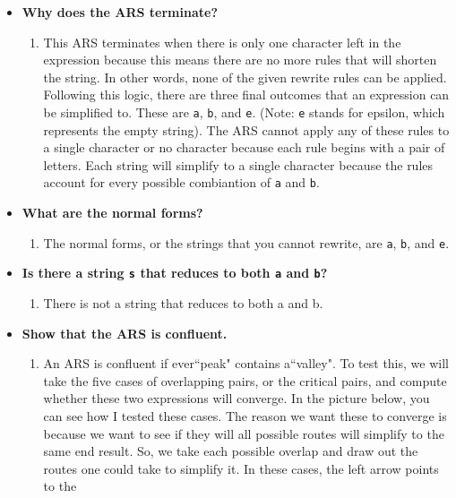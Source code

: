 \documentclass{article}
\theoremstyle{theorem}
\theoremstyle{definition}
\theoremstyle{remark}
\begin{document}
\begin{itemize}
  \item[\ding{99}] \textbf{Why does the ARS terminate?}
    \begin{enumerate} 
      \item[] This ARS terminates when there is only one character left in the expression because this means there are no more rules that will shorten the string. 
      In other words, none of the given rewrite rules can be applied. Following this logic, there are three final outcomes that an expression can be simplified to. 
      These are \texttt{a}, \texttt{b}, and \texttt{e}. (Note: \texttt{e} stands for epsilon, which represents the empty string). The ARS cannot apply any of these rules to a single character or no character 
      because each rule begins with a pair of letters. Each string will simplify to a single character because the rules account for every possible combiantion of \texttt{a} and \texttt{b}. 
    \end{enumerate}
  \item[\ding{99}] \textbf{What are the normal forms?} 
    \begin{enumerate} 
      \item[] The normal forms, or the strings that you cannot rewrite, are \texttt{a}, \texttt{b}, and \texttt{e}.
    \end{enumerate}
  \item[\ding{99}] \textbf{Is there a string \texttt{s} that reduces to both \texttt{a} and \texttt{b}?}
    \begin{enumerate} 
      \item[] There is not a string that reduces to both a and b. 
    \end{enumerate}
  \item[\ding{99}] \textbf{Show that the ARS is confluent.}
    \begin{enumerate} 
      \item[] An ARS is confluent if ever``peak" contains a``valley". To test this, we will take the five cases of overlapping pairs, or the critical pairs, and compute whether these 
      two expressions will converge. In the picture below, you can see how I tested these cases. The reason we want these to converge is because we want to see if they will all possible 
      routes will simplify to the same end result. So, we take each possible overlap and draw out the routes one could take to simplify it. In these cases, the left arrow points to the 

\end{enumerate}
\end{itemize}
\end{document}
